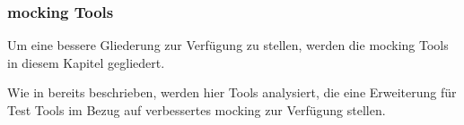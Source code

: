 \subsubsection{\Gls{mock}ing Tools}\label{python-tools:extlib:mock}

Um eine bessere Gliederung zur Verfügung zu stellen, werden die \Gls{mock}ing
Tools in diesem Kapitel gegliedert.

Wie in  bereits beschrieben, werden hier Tools analysiert,
die eine Erweiterung für Test Tools im Bezug auf verbessertes \gls{mock}ing zur 
Verfügung stellen.




